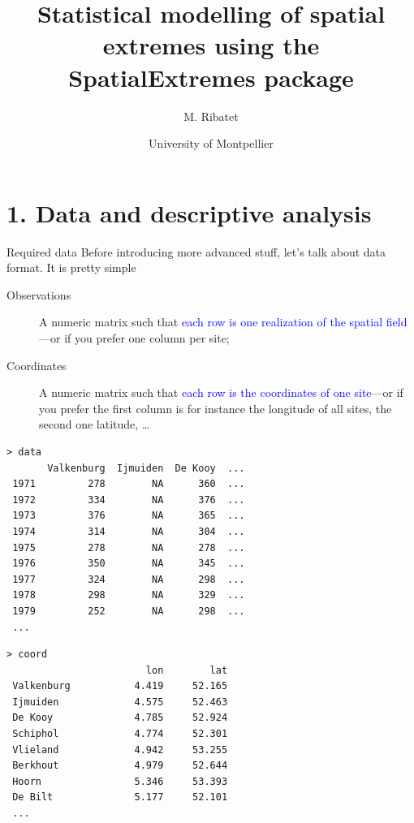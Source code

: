 \message{ !name(showv2.tex)}\documentclass[mode=present,style=simple]{powerdot}
\title{Statistical modelling of spatial extremes using the SpatialExtremes package}
\author{M. Ribatet}
\date{University of Montpellier}
\theoremstyle{plain}%
\theoremstyle{definition}
\theoremstyle{remark}
\begin{document}
\section{1. Data and descriptive analysis}

\begin{slide}[toc=Data format,method=direct]{Required data}
  Before introducing more advanced stuff, let's talk about data
  format. It is pretty simple
  \begin{description}
  \item[Observations] A numeric matrix such that \textcolor{blue}{each
      row is one realization of the spatial field}---or if you prefer
    one column per site;
  \item[Coordinates] A numeric matrix such that \textcolor{blue}{each
      row is the coordinates of one site}---or if you prefer the first
    column is for instance the longitude of all sites, the second one
    latitude, \ldots
  \end{description}
{\tiny
  \begin{minipage}[l]{.49\linewidth}
\begin{verbatim}
> data
       Valkenburg  Ijmuiden  De Kooy  ...
 1971         278        NA      360  ...
 1972         334        NA      376  ...
 1973         376        NA      365  ...
 1974         314        NA      304  ...
 1975         278        NA      278  ...
 1976         350        NA      345  ...
 1977         324        NA      298  ...
 1978         298        NA      329  ...
 1979         252        NA      298  ...
 ...
\end{verbatim}%
  \end{minipage}%
  \begin{minipage}[r]{.49\linewidth}
\begin{verbatim}
> coord
                        lon        lat
 Valkenburg           4.419     52.165
 Ijmuiden             4.575     52.463
 De Kooy              4.785     52.924
 Schiphol             4.774     52.301
 Vlieland             4.942     53.255
 Berkhout             4.979     52.644
 Hoorn                5.346     53.393
 De Bilt              5.177     52.101
 ...
\end{verbatim}
  \end{minipage}
}
\end{slide}
\end{document}
